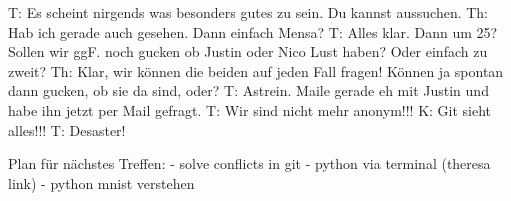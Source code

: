 T: Es scheint nirgends was besonders gutes zu sein. Du kannst aussuchen.
Th: Hab ich gerade auch gesehen. Dann einfach Mensa? 
T: Alles klar. Dann um 25? Sollen wir ggF. noch gucken ob Justin oder Nico Lust haben? Oder einfach zu zweit?
Th: Klar, wir können die beiden auf jeden Fall fragen! Können ja spontan dann gucken, ob sie da sind, oder? 
T: Astrein. Maile gerade eh mit Justin und habe ihn jetzt per Mail gefragt. 
T: Wir sind nicht mehr anonym!!!
K: Git sieht alles!!!
T: Desaster!

Plan für nächstes Treffen:
- solve conflicts in git
- python via terminal (theresa link)
- python mnist verstehen
